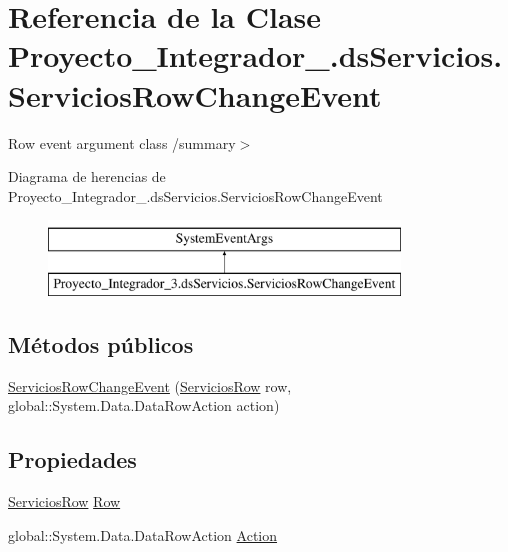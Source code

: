 \hypertarget{class_proyecto___integrador__3_1_1ds_servicios_1_1_servicios_row_change_event}{\section{Referencia de la Clase Proyecto\-\_\-\-Integrador\-\_.\-ds\-Servicios.\-Servicios\-Row\-Change\-Event}
\label{class_proyecto___integrador__3_1_1ds_servicios_1_1_servicios_row_change_event}
}


Row event argument class /summary$>$  


Diagrama de herencias de Proyecto\-\_\-\-Integrador\-\_.\-ds\-Servicios.\-Servicios\-Row\-Change\-Event\begin{figure}[H]
\begin{center}
\leavevmode
\includegraphics[height=2.000000cm]{class_proyecto___integrador__3_1_1ds_servicios_1_1_servicios_row_change_event}
\end{center}
\end{figure}
\subsection*{Métodos públicos}
\begin{DoxyCompactItemize}
\item 
\hyperlink{class_proyecto___integrador__3_1_1ds_servicios_1_1_servicios_row_change_event_ab03013b6ec28ef9ffccceafe1ac6478f}{Servicios\-Row\-Change\-Event} (\hyperlink{class_proyecto___integrador__3_1_1ds_servicios_1_1_servicios_row}{Servicios\-Row} row, global\-::\-System.\-Data.\-Data\-Row\-Action action)
\end{DoxyCompactItemize}
\subsection*{Propiedades}
\begin{DoxyCompactItemize}
\item 
\hyperlink{class_proyecto___integrador__3_1_1ds_servicios_1_1_servicios_row}{Servicios\-Row} \hyperlink{class_proyecto___integrador__3_1_1ds_servicios_1_1_servicios_row_change_event_a512b019ea6afe14ff0fab96bdae1b003}{Row}
\item 
global\-::\-System.\-Data.\-Data\-Row\-Action \hyperlink{class_proyecto___integrador__3_1_1ds_servicios_1_1_servicios_row_change_event_aec3aca217f6b4c8f2a4e3f6d15d875cc}{Action}
\end{DoxyCompactItemize}
